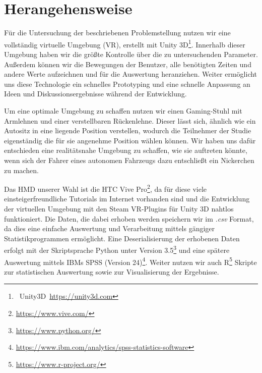\section{Herangehensweise}\label{sec:approach}  

Für die Untersuchung der beschriebenen Problemstellung nutzen wir eine vollständig virtuelle Umgebung (VR), erstellt mit Unity 3D\footnote{~Unity3D~\url{https://unity3d.com}}. Innerhalb dieser Umgebung haben wir die größte Kontrolle über die zu untersuchenden Parameter. Außerdem können wir die Bewegungen der Benutzer, alle benötigten Zeiten und andere Werte aufzeichnen und für die Auswertung heranziehen. Weiter ermöglicht uns diese Technologie ein schnelles Prototyping und eine schnelle Anpassung an Ideen und Diskussionsergebnisse während der Entwicklung.

Um eine optimale Umgebung zu schaffen nutzen wir einen Gaming-Stuhl mit Armlehnen und einer verstellbaren Rückenlehne. Dieser lässt sich, ähnlich wie ein Autositz in eine liegende Position verstellen, wodurch die Teilnehmer der Studie eigenständig die für sie angenehme Position wählen können. Wir haben uns dafür entschieden eine realitätsnahe Umgebung zu schaffen, wie sie auftreten könnte, wenn sich der Fahrer eines autonomen Fahrzeugs dazu entschließt ein Nickerchen zu machen.

Das HMD unserer Wahl ist die HTC Vive Pro\footnote{\url{https://www.vive.com/}}, da für diese viele einsteigerfreundliche Tutorials im Internet vorhanden sind und die Entwicklung der virtuellen Umgebung mit den Steam VR-Plugins für Unity 3D nahtlos funktioniert. Die Daten, die dabei erhoben werden speichern wir im \textit{.csv} Format, da dies eine einfache Auswertung und Verarbeitung mittels gängiger Statistikprogrammen ermöglicht. Eine Deserialisierung der erhobenen Daten erfolgt mit der Skriptsprache Python unter Version 3.5\footnote{\url{https://www.python.org/}} und eine spätere Auswertung mittels IBMs SPSS (Version 24)\footnote{\url{https://www.ibm.com/analytics/spss-statistics-software}}. Weiter nutzen wir auch R\footnote{\url{https://www.r-project.org/}} Skripte zur statistischen Auswertung sowie zur Visualisierung der Ergebnisse. 
